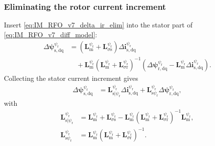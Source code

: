 \begin{frame}
    \frametitle{Eliminating the rotor current increment}
    Insert \eqref{eq:IM_RFO_v7_delta_ir_elim} into the stator part of \eqref{eq:IM_RFO_v7_diff_model}:
    \begin{equation}
        \begin{split}
            \Delta\bm{\psi}^{\psi_\mathrm{r}}_{\mathrm{s},\mathrm{dq}}
             & =\left(\bm{L}^{\psi_\mathrm{r}}_\mathrm{m}+\bm{L}^{\psi_\mathrm{r}}_{\sigma\mathrm{s}}\right)
            \Delta\bm{i}^{\psi_\mathrm{r}}_{\mathrm{s},\mathrm{dq}}                                          \\
             & \quad+\bm{L}^{\psi_\mathrm{r}}_\mathrm{m}
            \left(\bm{L}^{\psi_\mathrm{r}}_\mathrm{m}+\bm{L}^{\psi_\mathrm{r}}_{\sigma\mathrm{r}}\right)^{-1}
            \left(\Delta\bm{\psi}^{\psi_\mathrm{r}}_{\mathrm{r},\mathrm{dq}}-\bm{L}^{\psi_\mathrm{r}}_\mathrm{m}\Delta\bm{i}^{\psi_\mathrm{r}}_{\mathrm{s},\mathrm{dq}}\right).
        \end{split}
        \label{eq:IM_RFO_v7_insert_delta_ir}
    \end{equation}\pause%
    Collecting the stator current increment gives
    \begin{equation}
        \begin{split}
            \Delta\bm{\psi}^{\psi_\mathrm{r}}_{\mathrm{s},\mathrm{dq}}
             & =\bm{L}^{\psi_\mathrm{r}}_{\mathrm{s}|\psi_\mathrm{r}}\Delta\bm{i}^{\psi_\mathrm{r}}_{\mathrm{s},\mathrm{dq}}
            +\bm{L}^{\psi_\mathrm{r}}_{\mathrm{s}\psi_\mathrm{r}}\Delta\bm{\psi}^{\psi_\mathrm{r}}_{\mathrm{r},\mathrm{dq}},
        \end{split}
        \label{eq:IM_RFO_v7_reduced_diff_relation}
    \end{equation}
    with
    \begin{equation}
        \begin{split}
            \bm{L}^{\psi_\mathrm{r}}_{\mathrm{s}|\psi_\mathrm{r}}
             & =\bm{L}^{\psi_\mathrm{r}}_\mathrm{m}+\bm{L}^{\psi_\mathrm{r}}_{\sigma\mathrm{s}}
            -\bm{L}^{\psi_\mathrm{r}}_\mathrm{m}\left(\bm{L}^{\psi_\mathrm{r}}_\mathrm{m}+\bm{L}^{\psi_\mathrm{r}}_{\sigma\mathrm{r}}\right)^{-1}\bm{L}^{\psi_\mathrm{r}}_\mathrm{m}, \\
            \bm{L}^{\psi_\mathrm{r}}_{\mathrm{s}\psi_\mathrm{r}}
             & =\bm{L}^{\psi_\mathrm{r}}_\mathrm{m}\left(\bm{L}^{\psi_\mathrm{r}}_\mathrm{m}+\bm{L}^{\psi_\mathrm{r}}_{\sigma\mathrm{r}}\right)^{-1}.
        \end{split}
        \label{eq:IM_RFO_v7_Ls_and_Lsr}
    \end{equation}
\end{frame}

